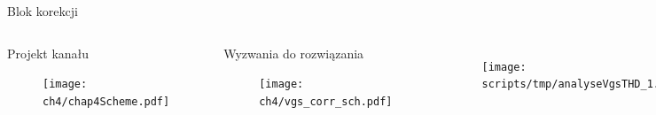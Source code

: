 \begin{frame}{Blok korekcji}
\begin{columns}

    \begin{block}{
        Projekt kanału}
        \begin{figure}[H]
            \centering
            \texttt{[image: ch4/chap4Scheme.pdf]}
        \end{figure} 
        \end{block}

        \begin{block}{
            Wyzwania do rozwiązania}
            \begin{figure}[H]
                \centering
                \texttt{[image: ch4/vgs\_corr\_sch.pdf]} 
            \end{figure}   
            \end{block}



    \begin{columns}

    \begin{figure}[H]
        \centering
        \texttt{[image: scripts/tmp/analyseVgsTHD\_1.pdf]}
    \end{figure} 
    \begin{figure}[H]
        \centering
        \texttt{[image: scripts/tmp/analyseVgsTHD\_2.pdf]}
    \end{figure} 
    \end{columns}   

    \begin{columns}

    \begin{figure}[H]
        \centering
        \texttt{[image: ch4/vgs\_corr0.pdf]}
    \end{figure} 
    \begin{figure}[H]
        \centering
        \texttt{[image: ch4/vgs\_corr1.pdf]}
    \end{figure} 
    \end{columns}   
\end{columns}  
\end{frame}



